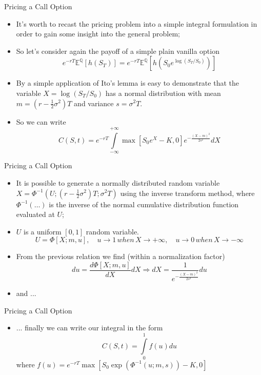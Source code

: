 \documentclass[11pt]{beamer}
\begin{document}
\begin{frame}{Pricing a Call Option}
\begin{itemize}
\item It's worth to recast the pricing problem into a simple integral formulation in order to gain some insight into the general problem;
\item So let's consider again the payoff of a simple plain vanilla option
$$e^{-rT} \mathbb{E^Q} [ h(S_T) ] = e^{-rT} \mathbb{E^Q} \left[ h \left( S_0 e^{\log(S_T/S_0)} \right) \right]$$
\item By a simple application of Ito's lemma is easy to demonstrate that the variable $X = \log(S_T/S_0)$ has a normal distribution with mean $m=(r-\frac{1}{2} \sigma^2)T$ and variance $s=\sigma^2T$.
\item So we can write
$$ C(S,t)= e^{-rT} \int\limits_{-\infty}^{+\infty} \max[S_0 e^X-K,0] e^{-\frac{(X-m)^2}{2s^2}} dX  $$
\end{itemize}
\end{frame}
\begin{frame}{Pricing a Call Option}
\begin{itemize}
\item It is possible to generate a normally distributed random variable $X=\Phi^{-1}(U;(r-\frac{1}{2} \sigma^2)T;\sigma^2T)$ using the inverse transform method, where $\Phi^{-1}(\dots)$ is the inverse of the normal cumulative distribution function evaluated at $U$;
\item $U$ is a uniform $[0,1]$ random variable.
$$U = \Phi[X;m,u], \quad u\rightarrow 1 \, when \, X \rightarrow +\infty, \quad u\rightarrow 0 \, when \, X \rightarrow -\infty$$
\item From the previous relation we find (within a normalization factor)
$$du = \frac{d\Phi[X;m,u]}{dX} dX  \Rightarrow dX = \frac{1}{e^{-\frac{(X-m)^2}{2s^2}}}du$$
\item and ...
\end{itemize}
\end{frame}
\begin{frame}{Pricing a Call Option}
\begin{itemize}
\item ... finally we can write our integral in the form
$$
C(S,t) = \int\limits_0^1 f(u) du$$
where $f(u) = e^{-rT} \max[S_0 \exp(\Phi^{-1}(u; m,s)) - K,0] $
\end{itemize}
\end{frame}
\end{document}
